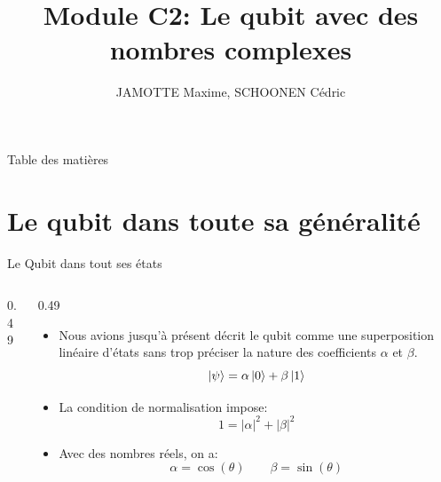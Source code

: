 \documentclass[aspectratio=169,12pt]{beamer}
\title[Module C2]{Module C2: Le qubit avec des nombres complexes}
\author{JAMOTTE Maxime, SCHOONEN Cédric}
\institute{Digital Learning Hub}
\date{}
\begin{document}
\begin{frame}
  \titlepage
\end{frame}

\begin{frame}{Table des matières}
  \tableofcontents
\end{frame}

\section{Le qubit dans toute sa généralité}

\begin{frame}{Le Qubit dans tout ses états}
    \begin{columns}[T]
    \begin{column}{0.49\textwidth}
      \begin{center}
      \end{center}
    \end{column}
    \begin{column}{0.49\textwidth}
    \begin{itemize}
        \item Nous avions jusqu'à présent décrit le qubit comme une superposition linéaire d'états sans trop préciser la nature des coefficients $\alpha$ et $\beta$.
        \begin{equation*}
            \ket{\psi} = \alpha \ket{0} + \beta \ket{1}
        \end{equation*}
        \item La condition de normalisation impose:
        \begin{equation*}
            1 = |\alpha|^{2} + |\beta|^{2}
        \end{equation*}
        \item Avec des nombres réels, on a:
        \begin{equation*}
            \alpha = \cos(\theta) \qquad \beta = \sin(\theta)
        \end{equation*} 
    \end{itemize}
    \end{column}
    \end{columns}
\end{frame}
\end{document}
